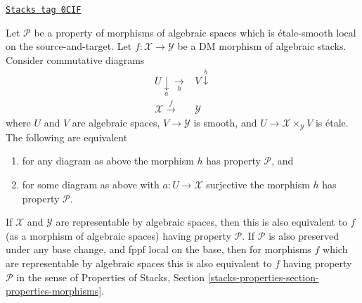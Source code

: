 \begin{lemma}
\label{stacks-morphisms-lemma-etale-smooth-local-source-target}
\href{https://stacks.math.columbia.edu/tag/0CIF}{\texttt{Stacks tag 0CIF}}

Let $\mathcal{P}$ be a property of morphisms of algebraic spaces
which is \'etale-smooth local on the source-and-target.
Let $f : \mathcal{X} \to \mathcal{Y}$ be a DM morphism of algebraic stacks.
Consider commutative diagrams
$$
\begin{array}{cc}U \underset{a}{\downarrow}\underset{h}{\longrightarrow} & V \overset{b}{\downarrow} \\ \mathcal{X} \overset{f}{\longrightarrow} & \mathcal{Y}\end{array}
$$
where $U$ and $V$ are algebraic spaces, $V \to \mathcal{Y}$ is smooth,
and $U \to \mathcal{X} \times_\mathcal{Y} V$ is \'etale.
The following are equivalent
\begin{enumerate}
\item for any diagram as above the morphism $h$ has property $\mathcal{P}$, and
\item for some diagram as above with $a : U \to \mathcal{X}$ surjective
the morphism $h$ has property $\mathcal{P}$.
\end{enumerate}
If $\mathcal{X}$ and $\mathcal{Y}$ are representable by algebraic spaces,
then this is also equivalent to $f$ (as a morphism of algebraic spaces)
having property $\mathcal{P}$. If $\mathcal{P}$ is also preserved under
any base change, and fppf local on the base, then for morphisms $f$
which are representable by algebraic spaces this
is also equivalent to $f$ having property $\mathcal{P}$ in the sense
of
Properties of Stacks,
Section \ref{stacks-properties-section-properties-morphisms}.
\end{lemma}

